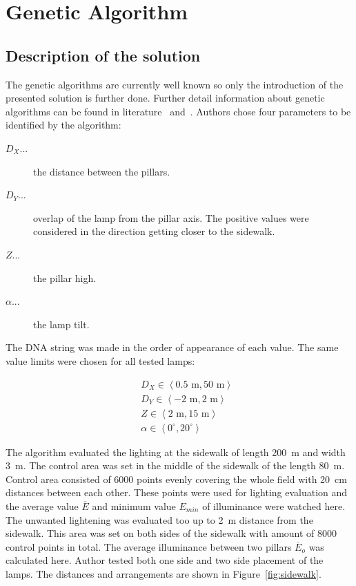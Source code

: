 \section{Genetic Algorithm}
\subsection{Description of the solution}
The genetic algorithms are currently well known so only the introduction of the presented solution is further done. Further detail information about genetic algorithms can be found in literature~\cite{Zelinka2009} and~\cite{Fogel2006}. Authors chose four parameters to be identified by the algorithm:

\begin{description}
	\item [$D_X$...] the distance between the pillars.
	\item [$D_Y$...] overlap of the lamp from the pillar axis. The positive values were considered in the direction getting closer to the sidewalk.
	\item [$Z$...] the pillar high.
	\item [$\alpha$...] the lamp tilt.
\end{description}

The DNA string was made in the order of appearance of each value. The same value limits were chosen for all tested lamps:

\begin{eqnarray}
&&D_X \in \left\langle 0.5 \text{ m}, 50 \text{ m}\right\rangle \label{eq:DXLim}\\
&&D_Y \in \left\langle -2 \text{ m}, 2 \text{ m}\right\rangle \\
&&Z \in \left\langle 2 \text{ m}, 15 \text{ m}\right\rangle \\
&&\alpha \in \left\langle 0^\circ, 20^\circ \right\rangle
\end{eqnarray}

The algorithm evaluated the lighting at the sidewalk of length 200~m and width 3~m. The control area was set in the middle of the sidewalk of the length 80~m. Control area consisted of 6000 points evenly covering the whole field with 20~cm distances between each other. These points were used for lighting evaluation and the average value $\overline{E}$ and minimum value $E_{min}$ of illuminance were watched here. The unwanted lightening was evaluated too up to 2~m distance from the sidewalk. This area was set on both sides of the sidewalk with amount of 8000 control points in total. The average illuminance between two pillars $\overline{E}_o$ was calculated here. Author tested both one side and two side placement of the lamps. The distances and arrangements are shown in Figure~\ref{fig:sidewalk}.

